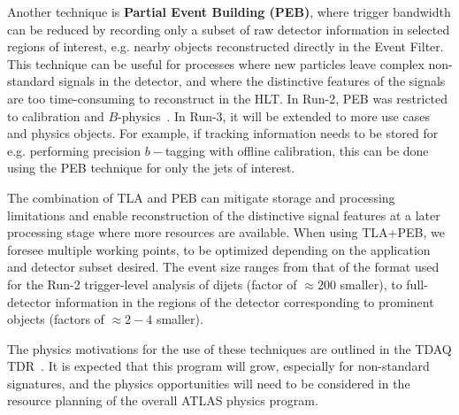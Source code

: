 Another technique is \textbf{Partial Event Building (PEB)}, where trigger bandwidth can be reduced by recording only a subset of raw detector information in selected regions of interest, e.g. nearby objects reconstructed directly in the Event Filter.
This technique can be useful for processes where new particles leave complex non-standard signals in the detector, and where the distinctive features of the signals are too time-consuming to reconstruct in the HLT. In Run-2, PEB was restricted to calibration and $B$-physics~\cite{TRIG-2016-01}.
In Run-3, it will be extended to more use cases and physics objects. 
For example, if tracking information needs to be stored for e.g. performing precision $b-$tagging with offline calibration, this can be done using the PEB technique for only the jets of interest.

The combination of TLA and PEB can mitigate storage and processing limitations and enable reconstruction of the distinctive signal features at a later processing stage where more resources are available.
When using TLA+PEB, we foresee multiple working points, to be optimized depending on the application and detector subset desired. The event size ranges from that of the format used for the Run-2 trigger-level analysis of dijets (factor of $\approx200$ smaller), to full-detector information in the regions of the detector corresponding to prominent objects (factors of $\approx 2-4$ smaller). 

The physics motivations for the use of these techniques are outlined in the TDAQ TDR~\cite{ATLAS-TDR-29}. It is expected that this program will grow, especially for non-standard signatures, and the physics opportunities will need to be considered in the resource planning of the overall ATLAS physics program.




